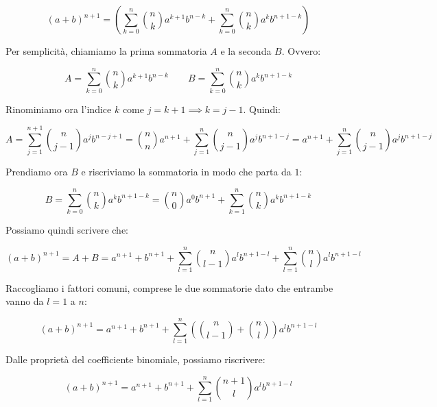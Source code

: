 \documentclass{article}
\begin{document}
\begin{equation*}
    (a+b)^{n+1} = \left(\sum_{k=0}^n \binom{n}{k} a^{k+1} b^{n-k} + \sum_{k=0}^n \binom{n}{k} a^k b^{n + 1-k}\right)
\end{equation*}

\noindent Per semplicità, chiamiamo la prima sommatoria $A$ e la seconda $B$. Ovvero:

\begin{equation*}
    A = \sum_{k=0}^n \binom{n}{k} a^{k+1} b^{n-k} \qquad B = \sum_{k=0}^n \binom{n}{k} a^k b^{n + 1-k}
\end{equation*}

\noindent Rinominiamo ora l'indice $k$ come $j = k + 1 \implies k = j - 1$. Quindi:

\begin{equation*}
    A = \sum_{j=1}^{n+1} \binom{n}{j-1} a^j b^{n-j+1} = \binom{n}{n} a^{n+1} + \sum_{j=1}^n \binom{n}{j-1} a^j b^{n+1-j} = a^{n+1} + \sum_{j=1}^n \binom{n}{j-1} a^j b^{n+1-j}
\end{equation*}

\noindent Prendiamo ora $B$ e riscriviamo la sommatoria in modo che parta da $1$:

\begin{equation*}
    B = \sum_{k=0}^n \binom{n}{k} a^k b^{n + 1-k} = \binom{n}{0} a^0 b^{n+1} + \sum_{k=1}^n \binom{n}{k} a^k b^{n + 1-k}
\end{equation*}

\noindent Possiamo quindi scrivere che: 

\begin{equation*}
    (a+b)^{n+1} = A + B = a^{n+1} + b^{n+1} + \sum_{l=1}^n \binom{n}{l-1} a^l b^{n+1-l} + \sum_{l=1}^n \binom{n}{l} a^l b^{n + 1-l}
\end{equation*}

\noindent Raccogliamo i fattori comuni, comprese le due sommatorie dato che entrambe vanno da $l = 1$ a $n$:

\begin{equation*}
    (a+b)^{n+1} = a^{n+1} + b^{n+1} + \sum_{l=1}^n \left(\binom{n}{l-1} + \binom{n}{l}\right) a^l b^{n+1-l}
\end{equation*}

\noindent Dalle proprietà del coefficiente binomiale, possiamo riscrivere: 

\begin{equation*}
    (a+b)^{n+1} = a^{n+1} + b^{n+1} + \sum_{l=1}^n \binom{n+1}{l} a^l b^{n+1-l}
\end{equation*}
\end{document}
